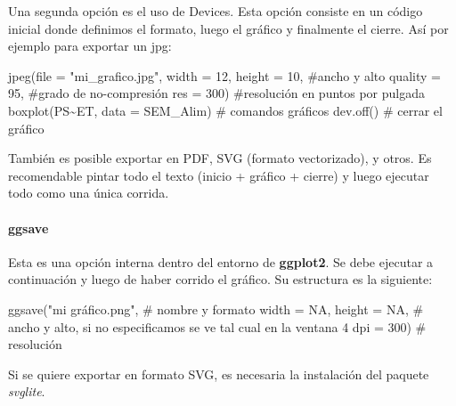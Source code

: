 \documentclass[
  letterpaper,
  DIV=11,
  numbers=noendperiod]{scrartcl}
\let\oldparagraph\paragraph
\renewcommand{\paragraph}[1]{\oldparagraph{#1}\mbox{}}
\newenvironment{Shaded}{\begin{snugshade}}{\end{snugshade}}
\newcommand{\AttributeTok}[1]{\textcolor[rgb]{0.40,0.45,0.13}{#1}}
\newcommand{\CommentTok}[1]{\textcolor[rgb]{0.37,0.37,0.37}{#1}}
\newcommand{\ConstantTok}[1]{\textcolor[rgb]{0.56,0.35,0.01}{#1}}
\newcommand{\DecValTok}[1]{\textcolor[rgb]{0.68,0.00,0.00}{#1}}
\newcommand{\FunctionTok}[1]{\textcolor[rgb]{0.28,0.35,0.67}{#1}}
\newcommand{\NormalTok}[1]{\textcolor[rgb]{0.00,0.23,0.31}{#1}}
\newcommand{\SpecialCharTok}[1]{\textcolor[rgb]{0.37,0.37,0.37}{#1}}
\newcommand{\StringTok}[1]{\textcolor[rgb]{0.13,0.47,0.30}{#1}}
\begin{document}
Una segunda opción es el uso de Devices. Esta opción consiste en un
código inicial donde definimos el formato, luego el gráfico y finalmente
el cierre. Así por ejemplo para exportar un jpg:

\begin{Shaded}
\begin{Highlighting}[]
\FunctionTok{jpeg}\NormalTok{(}\AttributeTok{file =} \StringTok{"mi\_grafico.jpg"}\NormalTok{,}
      \AttributeTok{width =} \DecValTok{12}\NormalTok{, }\AttributeTok{height =} \DecValTok{10}\NormalTok{, }\CommentTok{\#ancho y alto}
     \AttributeTok{quality =} \DecValTok{95}\NormalTok{, }\CommentTok{\#grado de no{-}compresión}
     \AttributeTok{res =} \DecValTok{300}\NormalTok{) }\CommentTok{\#resolución en puntos por pulgada}
\FunctionTok{boxplot}\NormalTok{(PS}\SpecialCharTok{\textasciitilde{}}\NormalTok{ET,}
        \AttributeTok{data =}\NormalTok{ SEM\_Alim) }\CommentTok{\# comandos gráficos}
\FunctionTok{dev.off}\NormalTok{() }\CommentTok{\# cerrar el gráfico}
\end{Highlighting}
\end{Shaded}

También es posible exportar en PDF, SVG (formato vectorizado), y otros.
Es recomendable pintar todo el texto (inicio + gráfico + cierre) y luego
ejecutar todo como una única corrida.

\hypertarget{ggsave}{%
\paragraph{ggsave}\label{ggsave}}

Esta es una opción interna dentro del entorno de \textbf{ggplot2}. Se
debe ejecutar a continuación y luego de haber corrido el gráfico. Su
estructura es la siguiente:

\begin{Shaded}
\begin{Highlighting}[]
\FunctionTok{ggsave}\NormalTok{(}\StringTok{"mi gráfico.png"}\NormalTok{, }\CommentTok{\# nombre y formato}
       \AttributeTok{width =} \ConstantTok{NA}\NormalTok{, }\AttributeTok{height =} \ConstantTok{NA}\NormalTok{, }\CommentTok{\# ancho y alto, si no especificamos se ve tal cual en la ventana 4}
       \AttributeTok{dpi =} \DecValTok{300}\NormalTok{) }\CommentTok{\# resolución}
\end{Highlighting}
\end{Shaded}

Si se quiere exportar en formato SVG, es necesaria la instalación del
paquete \emph{svglite}.
\end{document}
